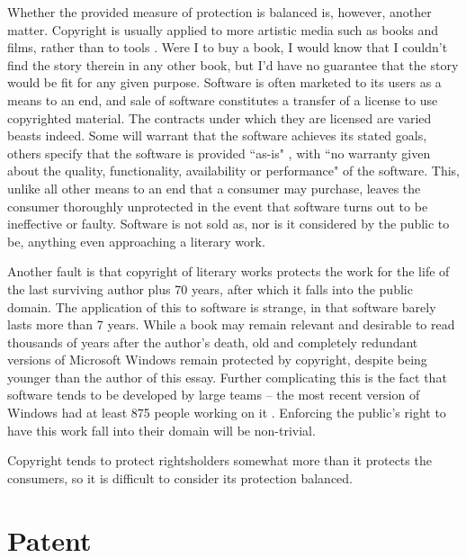 Whether the provided measure of protection is balanced is, however, another matter. Copyright is usually applied to more artistic media such as books and films, rather than to tools%
. Were I to buy a book, I would know that I couldn't find the story therein in any other book, but I'd have no guarantee that the story would be fit for any given purpose. Software is often marketed to its users as a means to an end, and sale of software constitutes a transfer of a license to use copyrighted material. The contracts under which they are licensed are varied beasts indeed. Some %
will warrant that the software achieves its stated goals, others specify that the software is provided ``as-is"%
, with ``no warranty given about the quality, functionality, availability or performance" of the software. This, unlike all other means to an end that a consumer may purchase, leaves the consumer thoroughly unprotected in the event that software turns out to be ineffective or faulty. Software is not sold as, nor is it considered by the public to be, anything even approaching a literary work. 

Another fault is that copyright of literary works protects the work for the life of the last surviving author plus 70 years, after which it falls into the public domain. The application of this to software is strange, in that software barely lasts more than 7 years. While a book may remain relevant and desirable to read thousands of years after the author's death, old and completely redundant versions of Microsoft Windows remain protected by copyright, despite being younger than the author of this essay. Further complicating this is the fact that software tends to be developed by large teams -- the most recent version of Windows had at least 875 people working on it %
. Enforcing the public's right to have this work fall into their domain will be non-trivial.

Copyright tends to protect rightsholders somewhat more than it protects the consumers, so it is difficult to consider its protection balanced.


\section{Patent}